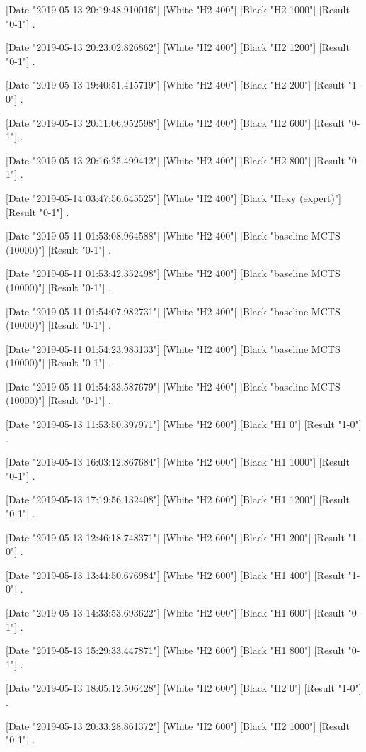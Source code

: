 {[Date "2019-05-13 20:19:48.910016"]
[White "H2 400"]
[Black "H2 1000"]
[Result "0-1"]
.

[Date "2019-05-13 20:23:02.826862"]
[White "H2 400"]
[Black "H2 1200"]
[Result "0-1"]
.

[Date "2019-05-13 19:40:51.415719"]
[White "H2 400"]
[Black "H2 200"]
[Result "1-0"]
.

[Date "2019-05-13 20:11:06.952598"]
[White "H2 400"]
[Black "H2 600"]
[Result "0-1"]
.

[Date "2019-05-13 20:16:25.499412"]
[White "H2 400"]
[Black "H2 800"]
[Result "0-1"]
.

[Date "2019-05-14 03:47:56.645525"]
[White "H2 400"]
[Black "Hexy (expert)"]
[Result "0-1"]
.

[Date "2019-05-11 01:53:08.964588"]
[White "H2 400"]
[Black "baseline MCTS (10000)"]
[Result "0-1"]
.

[Date "2019-05-11 01:53:42.352498"]
[White "H2 400"]
[Black "baseline MCTS (10000)"]
[Result "0-1"]
.

[Date "2019-05-11 01:54:07.982731"]
[White "H2 400"]
[Black "baseline MCTS (10000)"]
[Result "0-1"]
.

[Date "2019-05-11 01:54:23.983133"]
[White "H2 400"]
[Black "baseline MCTS (10000)"]
[Result "0-1"]
.

[Date "2019-05-11 01:54:33.587679"]
[White "H2 400"]
[Black "baseline MCTS (10000)"]
[Result "0-1"]
.

[Date "2019-05-13 11:53:50.397971"]
[White "H2 600"]
[Black "H1 0"]
[Result "1-0"]
.

[Date "2019-05-13 16:03:12.867684"]
[White "H2 600"]
[Black "H1 1000"]
[Result "0-1"]
.

[Date "2019-05-13 17:19:56.132408"]
[White "H2 600"]
[Black "H1 1200"]
[Result "0-1"]
.

[Date "2019-05-13 12:46:18.748371"]
[White "H2 600"]
[Black "H1 200"]
[Result "1-0"]
.

[Date "2019-05-13 13:44:50.676984"]
[White "H2 600"]
[Black "H1 400"]
[Result "1-0"]
.

[Date "2019-05-13 14:33:53.693622"]
[White "H2 600"]
[Black "H1 600"]
[Result "0-1"]
.

[Date "2019-05-13 15:29:33.447871"]
[White "H2 600"]
[Black "H1 800"]
[Result "0-1"]
.

[Date "2019-05-13 18:05:12.506428"]
[White "H2 600"]
[Black "H2 0"]
[Result "1-0"]
.

[Date "2019-05-13 20:33:28.861372"]
[White "H2 600"]
[Black "H2 1000"]
[Result "0-1"]
.

}
